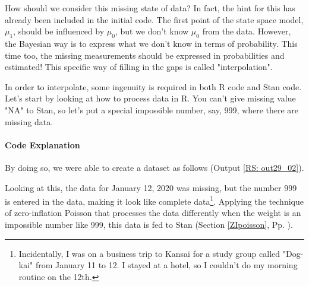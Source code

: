 \documentclass{ltjsbook}
\begin{document}
How should we consider this missing state of data? In fact, the hint for this has already been included in the initial code.
The first point of the state space model, $\mu_1$, should be influenced by $\mu_0$, but we don't know $\mu_0$ from the data. However, the Bayesian way is to express what we don't know in terms of probability.
This time too, the missing measurements should be expressed in probabilities and estimated! This specific way of filling in the gaps is called "interpolation".

In order to interpolate, some ingenuity is required in both R code and Stan code.
Let's start by looking at how to process data in R. You can't give missing value "NA" to Stan, so let's put a special impossible number, say, 999, where there are missing data.



\paragraph{Code Explanation}


By doing so, we were able to create a dataset as follows (Output \ref{RS: out29_02}).

Looking at this, the data for January 12, 2020 was missing, but the number 999 is entered in the data, making it look like complete data\footnote{Incidentally, I was on a business trip to Kansai for a study group called "Dog-kai" from January 11 to 12. I stayed at a hotel, so I couldn't do my morning routine on the 12th.}. Applying the technique of zero-inflation Poisson that processes the data differently when the weight is an impossible number like 999, this data is fed to Stan (Section \ref{ZIpoisson}, Pp. \pageref{ZIpoisson}).

\end{document}
